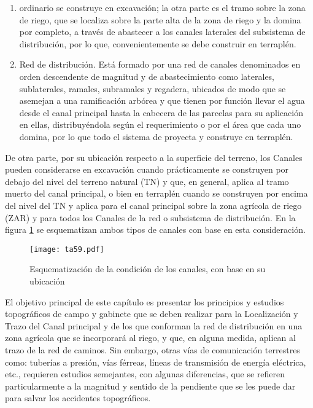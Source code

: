 \begin{enumerate}
    \item ordinario se construye en excavación; la otra parte es el tramo sobre la zona de riego, que se localiza sobre la parte alta de la zona de riego y la domina por completo, a través de abastecer a los canales laterales del subsistema de distribución, por lo que, convenientemente se debe construir en terraplén.
    \item Red de distribución. Está formado por una red de canales denominados en orden descendente de magnitud y de abastecimiento como laterales, sublaterales, ramales, subramales y regadera, ubicados de modo que se asemejan a una ramificación arbórea y que tienen por función llevar el agua desde el canal principal hasta la cabecera de las parcelas para su aplicación en ellas, distribuyéndola según el requerimiento o por el área que cada uno domina, por lo que todo el sistema de proyecta y construye en terraplén.
\end{enumerate}

De otra parte, por su ubicación respecto a la superficie del terreno, los Canales pueden considerarse en excavación cuando prácticamente se construyen por debajo del nivel del terreno natural (TN) y que, en general, aplica al tramo muerto del canal principal, o bien en terraplén cuando se construyen por encima del nivel del TN y aplica para el canal principal sobre la zona agrícola de riego (ZAR) y para todos los Canales de la red o subsistema de distribución. 
En la figura \ref{ta59} se esquematizan ambos tipos de canales con base en esta consideración.

\begin{figure}[h!]
\centering
  \texttt{[image: ta59.pdf]}
  \caption{Esquematización de la condición de los canales, con base en su ubicación}
  \label{ta59}
\end{figure}

El objetivo principal de este capítulo es presentar los principios y estudios topográficos de campo y gabinete que se deben realizar para la Localización y Trazo del Canal principal y de los que conforman la red de distribución en una zona agrícola que se
incorporará al riego, y que, en alguna medida, aplican al trazo de la red de caminos. Sin embargo, otras vías de comunicación terrestres como: tuberías a presión, vías férreas, líneas de transmisión de energía eléctrica, etc., requieren estudios semejantes, con algunas diferencias, que se refieren particularmente a la magnitud y sentido de la pendiente que se les puede dar para salvar los accidentes topográficos.

